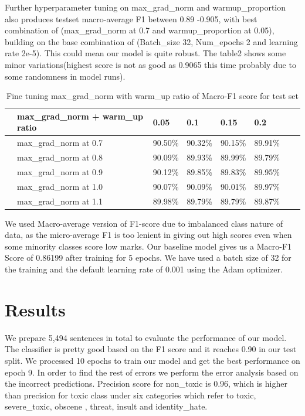 \documentclass[sigconf]{acmart}
\begin{document}
Further hyperparameter tuning on max\_grad\_norm and warmup\_proportion also produces testset macro-average F1 between 0.89 -0.905, with best combination of (max\_grad\_norm at 0.7 and warmup\_proportion at 0.05), building on the base combination of (Batch\_size 32, Num\_epochs 2 and learning rate 2e-5). This could mean our model is quite robust. The table2 shows some minor variations(highest score is not as good as 0.9065 this time probably due to some randomness in model runs).

\begin{table}
	\caption {\label{tab:table2} Fine tuning max\_grad\_norm with warm\_up ratio of Macro-F1 score for test set} 
	\centering
	\begin{tabular}{llllllll}
		\hline
		& max\_grad\_norm + warm\_up ratio  & 0.05  &  0.1  & 0.15 & 0.2 \\
		\hline
		& max\_grad\_norm at 0.7 & 90.50\% & 90.32\% & 90.15\% & 89.91\%   \\
		& max\_grad\_norm at 0.8 & 90.09\% & 89.93\% & 89.99\% & 89.79\%  \\
		& max\_grad\_norm at 0.9 & 90.12\% & 89.85\% & 89.83\% & 89.95\%   \\
		& max\_grad\_norm at 1.0 & 90.07\% & 90.09\% & 90.01\% & 89.97\%   \\
		& max\_grad\_norm at 1.1 & 89.98\% & 89.79\% & 89.79\% & 89.87\%   \\
		\hline
	\end{tabular}
\end{table}

We used Macro-average version of F1-score due to imbalanced class nature of data, as the micro-average F1 is too lenient in giving out high scores even when some minority classes score low marks. Our baseline model gives us a Macro-F1 Score of 0.86199 after training for 5 epochs. We have used a batch size of 32 for the training and the default learning rate of 0.001 using the Adam optimizer.



\section{Results}

We prepare 5,494 sentences in total to evaluate the performance of our model. The classifier is pretty good based on the F1 score and it reaches 0.90 in our test split. We processed 10 epochs to train our model and get the best performance on epoch 9. In order to find the rest of errors we perform the error analysis based on the incorrect predictions. Precision score for non\_toxic is 0.96, which is higher than precision for toxic class under six categories which refer to toxic, severe\_toxic, obscene , threat, insult and identity\_hate.
\end{document}
